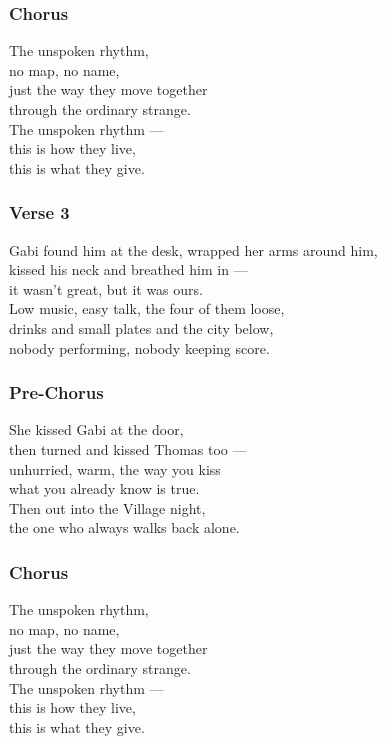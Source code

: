 \documentclass[]{article}
\begin{document}
\subsubsection{Chorus}\label{chorus-71}

The unspoken rhythm,\\
no map, no name,\\
just the way they move together\\
through the ordinary strange.\\
The unspoken rhythm ---\\
this is how they live,\\
this is what they give.

\subsubsection{Verse 3}\label{verse-3-11}

Gabi found him at the desk, wrapped her arms around him,\\
kissed his neck and breathed him in ---\\
it wasn't great, but it was ours.\\
Low music, easy talk, the four of them loose,\\
drinks and small plates and the city below,\\
nobody performing, nobody keeping score.

\subsubsection{Pre-Chorus}\label{pre-chorus-42}

She kissed Gabi at the door,\\
then turned and kissed Thomas too ---\\
unhurried, warm, the way you kiss\\
what you already know is true.\\
Then out into the Village night,\\
the one who always walks back alone.

\subsubsection{Chorus}\label{chorus-72}

The unspoken rhythm,\\
no map, no name,\\
just the way they move together\\
through the ordinary strange.\\
The unspoken rhythm ---\\
this is how they live,\\
this is what they give.
\end{document}
